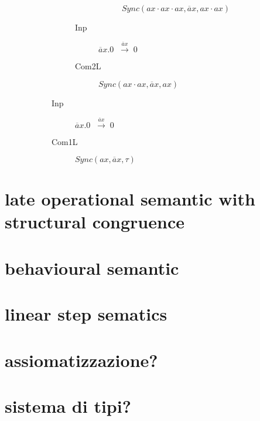 \begin{example}
\begin{description}
\begin{description}
\begin{description}
\begin{description}
\begin{description}
		      $Sync(
			ax \cdot ax \cdot ax,
			\overline{a}x,
			ax \cdot ax
		      )$
		  \end{description}
		\item[Inp]
		  $\overline{a}x.0\;\;\xrightarrow{\overline{a}x}\;0$	 
		\item[Com2L]
		  $Sync(ax\cdot ax,\overline{a}x,ax)$
	      \end{description}
	    \item[Inp]
	      $\overline{a}x.0\;\;\xrightarrow{\overline{a}x}\;0$	      
	    \item[Com1L]
	      $Sync(ax,\overline{a}x,\tau)$
	  \end{description}
    \end{description}
  \end{description}

\end{example}



\section{late operational semantic with structural congruence}
\section{behavioural semantic}
\section{linear step sematics}
\section{assiomatizzazione?}
\section{sistema di tipi?}